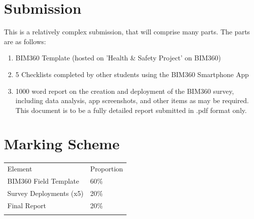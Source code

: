 \section*{Submission}
This is a relatively complex submission, that will comprise many parts.  The parts are as follows:
\begin{enumerate}
	\item BIM360 Template (hosted on 'Health \& Safety Project' on BIM360)
	\item 5 Checklists completed by other students using the BIM360 Smartphone App
	\item 1000 word report on the creation and deployment of the BIM360 survey, including data analysis, app screenshots, and other items as may be required.  This document is to be a fully detailed report submitted in .pdf format only.
\end{enumerate}



\section*{Marking Scheme}
\begin{table}[h!]
	\begin{center}
		\begin{tabular}{p{8cm}  p{2cm} }
			\toprule
			\large{Element} & \large{Proportion} \\ 
			\cmidrule(r){1-1}\cmidrule(lr){2-2}
			BIM360 Field Template & 60\%\\
			Survey Deployments (x5) & 20\%\\
			Final Report & 20\%\\     
			\\ \bottomrule
		\end{tabular}
		\label{tbl:markSchemeAsmt3}
	\end{center}
\end{table}


